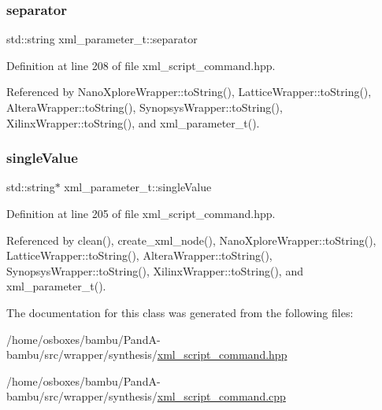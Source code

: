 \mbox{\label{classxml__parameter__t_afa8e2f2feafccd502a29ba8ce48658a5}} 
\subsubsection{\texorpdfstring{separator}{separator}}
{\footnotesize\ttfamily std\+::string xml\+\_\+parameter\+\_\+t\+::separator}



Definition at line 208 of file xml\+\_\+script\+\_\+command.\+hpp.



Referenced by Nano\+Xplore\+Wrapper\+::to\+String(), Lattice\+Wrapper\+::to\+String(), Altera\+Wrapper\+::to\+String(), Synopsys\+Wrapper\+::to\+String(), Xilinx\+Wrapper\+::to\+String(), and xml\+\_\+parameter\+\_\+t().

\mbox{\label{classxml__parameter__t_a361a307b22517fbb5f7e515dd2e01b91}} 
\subsubsection{\texorpdfstring{single\+Value}{singleValue}}
{\footnotesize\ttfamily std\+::string$\ast$ xml\+\_\+parameter\+\_\+t\+::single\+Value}



Definition at line 205 of file xml\+\_\+script\+\_\+command.\+hpp.



Referenced by clean(), create\+\_\+xml\+\_\+node(), Nano\+Xplore\+Wrapper\+::to\+String(), Lattice\+Wrapper\+::to\+String(), Altera\+Wrapper\+::to\+String(), Synopsys\+Wrapper\+::to\+String(), Xilinx\+Wrapper\+::to\+String(), and xml\+\_\+parameter\+\_\+t().



The documentation for this class was generated from the following files\+:\begin{DoxyCompactItemize}
\item 
/home/osboxes/bambu/\+Pand\+A-\/bambu/src/wrapper/synthesis/\hyperlink{xml__script__command_8hpp}{xml\+\_\+script\+\_\+command.\+hpp}\item 
/home/osboxes/bambu/\+Pand\+A-\/bambu/src/wrapper/synthesis/\hyperlink{xml__script__command_8cpp}{xml\+\_\+script\+\_\+command.\+cpp}\end{DoxyCompactItemize}
